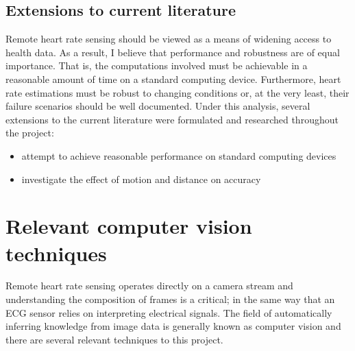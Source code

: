 \subsection{Extensions to current literature}
Remote heart rate sensing should be viewed as a means of widening access to health data.
As a result, I believe that
performance and robustness are of equal importance. That is, the computations involved must be achievable in a reasonable amount of time on a standard computing device.
Furthermore, heart rate estimations must be robust to changing conditions or, at the very least, their failure scenarios should be well documented. 
Under this analysis, several extensions to the current literature were formulated and researched throughout the project:
\begin{itemize}
    \item attempt to achieve reasonable performance on standard computing devices
    \item investigate the effect of motion and distance on accuracy
\end{itemize}


\section{Relevant computer vision techniques}
Remote heart rate sensing operates directly on a camera stream and understanding the composition of frames is a critical; in the same way that an ECG sensor relies on interpreting electrical signals. 
The field of automatically inferring knowledge from image data is generally known as computer vision and there are several relevant techniques to this project.

